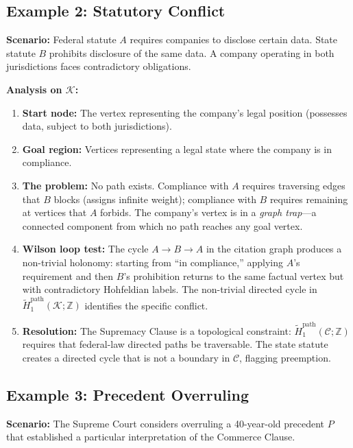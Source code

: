 \documentclass[12pt]{article}
\theoremstyle{definition}
\theoremstyle{remark}
\newcommand{\C}{\mathcal{C}}               %
\newcommand{\Z}{\mathbb{Z}}
\begin{document}
\subsection{Example 2: Statutory Conflict}

\textbf{Scenario:} Federal statute $A$ requires companies to disclose certain data.  State statute $B$ prohibits disclosure of the same data.  A company operating in both jurisdictions faces contradictory obligations.

\textbf{Analysis on $\mathcal{K}$:}
\begin{enumerate}
    \item \textbf{Start node:} The vertex representing the company's legal position (possesses data, subject to both jurisdictions).
    \item \textbf{Goal region:} Vertices representing a legal state where the company is in compliance.
    \item \textbf{The problem:} No path exists.  Compliance with $A$ requires traversing edges that $B$ blocks (assigns infinite weight); compliance with $B$ requires remaining at vertices that $A$ forbids.  The company's vertex is in a \emph{graph trap}---a connected component from which no path reaches any goal vertex.
    \item \textbf{Wilson loop test:} The cycle $A \to B \to A$ in the citation graph produces a non-trivial holonomy: starting from ``in compliance,'' applying $A$'s requirement and then $B$'s prohibition returns to the same factual vertex but with contradictory Hohfeldian labels.  The non-trivial directed cycle in $\widetilde{H}_1^{\text{path}}(\mathcal{K}; \Z)$ identifies the specific conflict.
    \item \textbf{Resolution:} The Supremacy Clause is a topological constraint: $\widetilde{H}_1^{\text{path}}(\C; \Z)$ requires that federal-law directed paths be traversable.  The state statute creates a directed cycle that is not a boundary in $\C$, flagging preemption.
\end{enumerate}

\subsection{Example 3: Precedent Overruling}

\textbf{Scenario:} The Supreme Court considers overruling a 40-year-old precedent $P$ that established a particular interpretation of the Commerce Clause.
\end{document}
